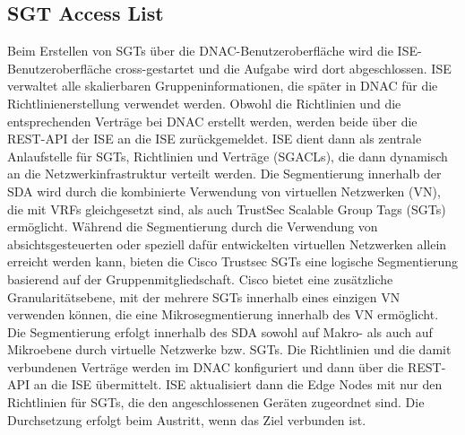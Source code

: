 \subsection{SGT Access List}
Beim Erstellen von SGTs über die DNAC-Benutzeroberfläche wird die ISE-Benutzeroberfläche cross-gestartet und die Aufgabe wird dort abgeschlossen. ISE verwaltet alle skalierbaren Gruppeninformationen, die später in DNAC für die Richtlinienerstellung verwendet werden. Obwohl die Richtlinien und die entsprechenden Verträge bei DNAC erstellt werden, werden beide über die REST-API der ISE an die ISE zurückgemeldet. ISE dient dann als zentrale Anlaufstelle für SGTs, Richtlinien und Verträge (SGACLs), die dann dynamisch an die Netzwerkinfrastruktur verteilt werden.
Die Segmentierung innerhalb der SDA wird durch die kombinierte Verwendung von virtuellen Netzwerken (VN), die mit VRFs gleichgesetzt sind, als auch TrustSec Scalable Group Tags (SGTs) ermöglicht. Während die Segmentierung durch die Verwendung von absichtsgesteuerten oder speziell dafür entwickelten virtuellen Netzwerken allein erreicht werden kann, bieten die Cisco Trustsec SGTs eine logische Segmentierung basierend auf der Gruppenmitgliedschaft. Cisco bietet eine zusätzliche Granularitätsebene, mit der mehrere SGTs innerhalb eines einzigen VN verwenden können, die eine Mikrosegmentierung innerhalb des VN ermöglicht. Die Segmentierung erfolgt innerhalb des SDA sowohl auf Makro- als auch auf Mikroebene durch virtuelle Netzwerke bzw. SGTs. Die Richtlinien und die damit verbundenen Verträge werden im DNAC konfiguriert und dann über die REST-API an die ISE übermittelt. ISE aktualisiert dann die Edge Nodes mit nur den Richtlinien für SGTs, die den angeschlossenen Geräten zugeordnet sind. Die Durchsetzung erfolgt beim Austritt, wenn das Ziel verbunden ist. \cite{sda-segmentation-may2018}

